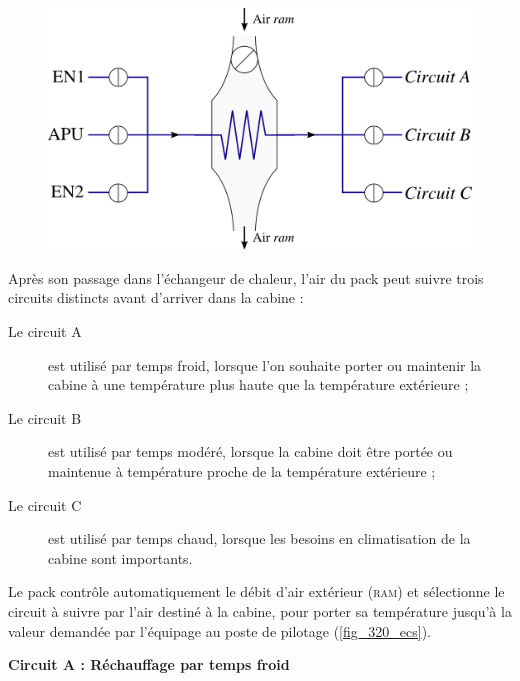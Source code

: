 	\begin{figure}
		\begin{center}
			\includegraphics[width=\textwidth]{images/pack.png}
		\end{center}
		\label{fig_pack}
	\end{figure}

	Après son passage dans l’échangeur de chaleur, l’air du pack peut suivre trois circuits distincts avant d’arriver dans la cabine :
		\begin{description}
			\item[Le circuit A] est utilisé par temps froid, lorsque l’on souhaite porter ou maintenir la cabine à une température plus haute que la température extérieure ;
			\item[Le circuit B] est utilisé par temps modéré, lorsque la cabine doit être portée ou maintenue à température proche de la température extérieure ;
			\item [Le circuit C] est utilisé par temps chaud, lorsque les besoins en climatisation de la cabine sont importants.
		\end{description}
	
	Le pack contrôle automatiquement le débit d’air extérieur (\textsc{ram}) et sélectionne le circuit à suivre par l’air destiné à la cabine, pour porter sa température jusqu’à la valeur demandée par l’équipage au poste de pilotage (\cref{fig_320_ecs}).
	
\textbf{Circuit A : Réchauffage par temps froid}

